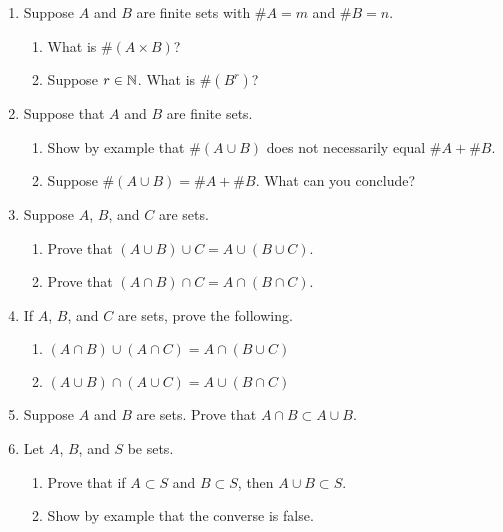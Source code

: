 \begin{enumerate}
    \item Suppose $A$ and $B$ are finite sets with $\# A = m$ and $\# B = n$.
  \begin{enumerate}
      \item What is $\# (A \times B)$?
      \item Suppose $r \in \mathbb{N}$. What is $\# (B^r)$?
  \end{enumerate}

    \item Suppose that $A$ and $B$ are finite sets.
  \begin{enumerate}
      \item Show by example that $\# (A \cup B)$ does not necessarily equal $\# A + \# B$. 
      \item Suppose $\# (A \cup B) = \# A + \# B$. What can you conclude?
  \end{enumerate}

    \item Suppose $A$, $B$, and $C$ are sets.
  \begin{enumerate}
      \item Prove that $(A \cup B) \cup C = A \cup (B \cup C)$.
      \item Prove that $(A \cap B) \cap C = A \cap (B \cap C)$.
  \end{enumerate}

    \item If $A$, $B$, and $C$ are sets, prove the following.
  \begin{enumerate}
      \item $(A \cap B) \cup (A \cap C) = A \cap (B \cup C)$
      \item $(A \cup B) \cap (A \cup C) = A \cup (B \cap C)$
  \end{enumerate}

    \item Suppose $A$ and $B$ are sets. Prove that $A \cap B \subset A \cup B$.

    \item Let $A$, $B$, and $S$ be sets.
  \begin{enumerate}
      \item Prove that if $A \subset S$ and $B \subset S$, then $A \cup B \subset S$.
      \item Show by example that the converse is false.
  \end{enumerate}



\end{enumerate}
